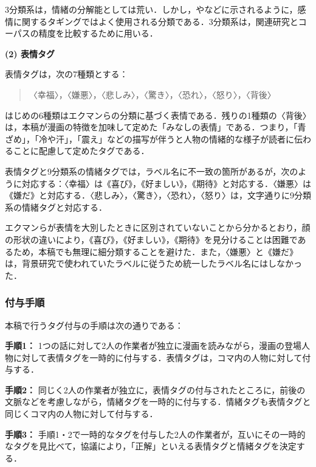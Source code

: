 \documentclass[japanese]{jnlp_1.3c}
\begin{document}
3分類系は，情緒の分解能としては荒い．しかし，\cite{Litman03}や\cite{Craggs&Wood04}などに示されるように，感情に関するタギングではよく使用される分類である．3分類系は，関連研究とコーパスの精度を比較するために用いる．

\noindent
{\bf (2) 表情タグ}

表情タグは，次の7種類とする：
\begin{quote}
〈幸福〉，〈嫌悪〉，〈悲しみ〉，〈驚き〉，〈恐れ〉，〈怒り〉，〈背後〉
\end{quote}

はじめの6種類はエクマンらの分類\cite{エクマン&フリーセン90}に基づく表情である．残りの1種類の〈背後〉は，本稿が漫画の特徴を加味して定めた「みなしの表情」である．つまり，「青ざめ」，「冷や汗」，「震え」などの描写が伴うと人物の情緒的な様子が読者に伝わることに配慮して定めたタグである．

表情タグと9分類系の情緒タグでは，ラベル名に不一致の箇所があるが，次のように対応する：〈幸福〉は《喜び》，《好ましい》，《期待》と対応する．〈嫌悪〉は《嫌だ》と対応する．〈悲しみ〉，〈驚き〉，〈恐れ〉，〈怒り〉は，文字通りに9分類系の情緒タグと対応する．

エクマンらが表情を大別したときに区別されていないことから分かるとおり，顔の形状の違いにより，《喜び》，《好ましい》，《期待》を見分けることは困難であるため，本稿でも無理に細分類することを避けた．また，〈嫌悪〉と《嫌だ》は，背景研究で使われていたラベルに従うため統一したラベル名にはしなかった．


\subsubsection{付与手順}

本稿で行うタグ付与の手順は次の通りである：

\begin{description}

\item {\bf 手順1：} 1つの話に対して2人の作業者が独立に漫画を読みながら，漫画の登場人物に対して表情タグを一時的に付与する．表情タグは，コマ内の人物に対して付与する．

\item {\bf 手順2：} 同じく2人の作業者が独立に，表情タグの付与されたところに，前後の文脈などを考慮しながら，情緒タグを一時的に付与する．情緒タグも表情タグと同じくコマ内の人物に対して付与する．

\item {\bf 手順3：} 手順1・2で一時的なタグを付与した2人の作業者が，互いにその一時的なタグを見比べて，協議により，「正解」といえる表情タグと情緒タグを決定する．

\end{description}
\end{document}
